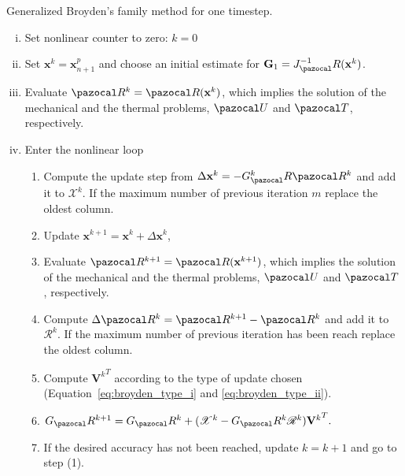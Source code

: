 \begin{framedbox}[htb]
  \caption{Generalized Broyden's family method for one timestep.}
  \label{box:broydens_method}
  \begin{center}
    \begin{minipage}{0.9\textwidth}
    \begin{enumerate}[(i)]
    \item Set nonlinear counter to zero: \(k=0\)
    \item Set \(\mathbf x^k = \mathbf x_{n+ 1}^p\) and choose an initial estimate for \(\mathbf G_1 = J^{-1}_\pazocal R(\mathbf x^k)\).
    \item Evaluate \(\pazocal R^k = \pazocal R(\mathbf x^k)\), which implies the solution of the mechanical and the thermal problems, \(\pazocal U\) and \(\pazocal T\), respectively.
    \item Enter the nonlinear loop
    \begin{enumerate}[(1)]
      \item Compute the update step from \(\Delta \mathbf x^k = - G^k_\pazocal R \pazocal R^k\) and add it to \(\mathscr X^k\). If the maximum number of previous iteration \(m\) replace the oldest column.
      \item Update \(\mathbf x^{k+1} = \mathbf x^k + \Delta \mathbf x^k\),
      \item Evaluate \(\pazocal R^{k+1} = \pazocal R(\mathbf x^{k+1})\), which implies the solution of the mechanical and the thermal problems, \(\pazocal U\) and \(\pazocal T\), respectively.
      \item Compute \(\Delta \pazocal R^k = \pazocal R^{k+1} - \pazocal R^k\) and add it to \(\mathscr R^k\). If the maximum number of previous iteration has been reach replace the oldest column.
      \item Compute \({\mathbf V^k}^T\) according to the type of update chosen (Equation~\eqref{eq:broyden_type_i} and \eqref{eq:broyden_type_ii}).
      \item \(G_\pazocal R^{k+1} = G_\pazocal R^k + (\mathscr X^k - G_\pazocal R^k\mathscr R^k){{\mathbf{V}}^k}^T.\)
      \item If the desired accuracy has not been reached, update \(k=k+1\) and go to step (1).
    \end{enumerate}
    \end{enumerate}
    \end{minipage}
  \end{center}
\end{framedbox}

